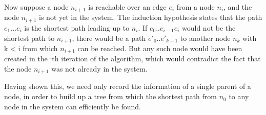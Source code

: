Now suppose a node $n_{i+1}$ is reachable over an edge $e_i$ from a node $n_i$, and the node $n_{i+1}$ is not yet in the system. The induction hypothesis states that the path $e_1...e_i$ is the shortest path leading up to $n_i$. If $e_0..e_{i-1}e_i$ would not be the shortest path to $n_{i+1}$, there would be a path $e'_0..e'_{k-1}$ to another node $n_k$ with k < i from which $n_{i+1}$ can be reached. But any such node would have been created in the :th iteration of the algorithm, which would contradict the fact that the node $n_{i+1}$ was not already in the system.
 
Having shown this, we need only record the information of a single parent of a node, in order to build up a tree from which the shortest path from $n_0$ to any node in the system can efficiently be found.




